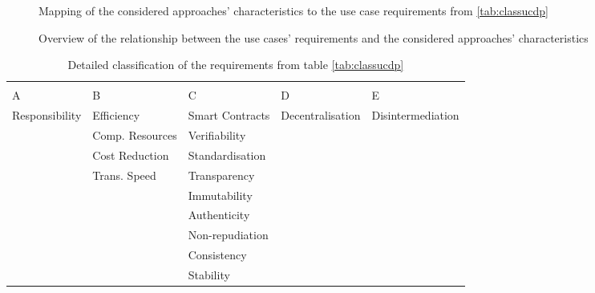 \begin{figure}[H]
    \centering
    \caption{Mapping of the considered approaches' characteristics to the use case requirements from \ref{tab:classucdp}}
    
    
    \label{fig:map-cac-ucr}
\end{figure}

\begin{figure}[H]
  \hspace{40pt} 
  \caption{Overview of the relationship between the use cases' requirements and the considered approaches' characteristics}
  \label{fig:cac-ucr}
\end{figure}

\begin{table}[H]
    \centering
    \caption{Detailed classification of the requirements from table \ref{tab:classucdp}}
    \label{tab:classdetailedreq}
    
\begin{tabular}{m{2.5cm} m{3cm} m{3cm} m{3cm} m{3cm} }

&&\\
\hspace{30pt}A & \hspace{30pt}B & \hspace{30pt}C & \hspace{30pt}D & \hspace{30pt}E \\ \hline

\rule{0pt}{3ex}Responsibility & \rule{0pt}{3ex}Efficiency & \rule{0pt}{3ex}Smart Contracts & \rule{0pt}{3ex}Decentralisation & \rule{0pt}{3ex}Disintermediation \\ 
 & Comp. Resources & Verifiability & & \\
 & Cost Reduction & Standardisation & & \\
 & Trans. Speed & Transparency & & \\
 & & Immutability & & \\
 & & Authenticity & & \\
 & & Non-repudiation & & \\
 & & Consistency & & \\
 & & Stability & & \\

\end{tabular}

    
\end{table}





